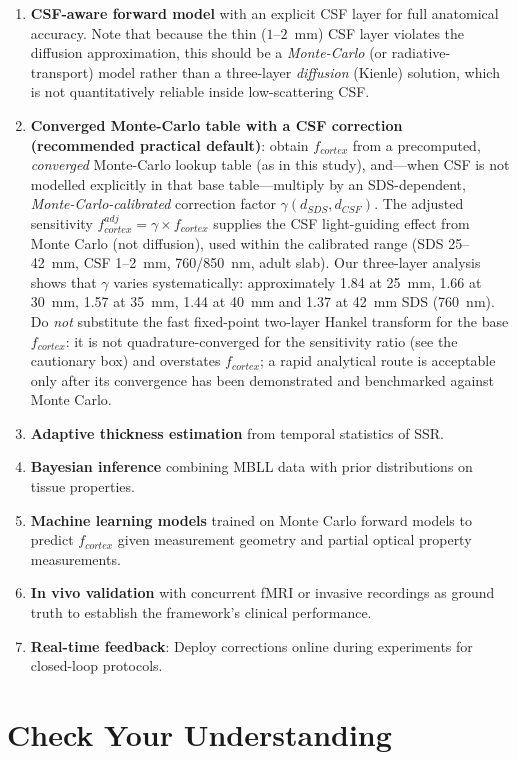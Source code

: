 \documentclass[12pt]{article}
\def\text#1{#1}%
\begin{document}
\begin{enumerate}
\item \textbf{CSF-aware forward model} with an explicit CSF layer for full anatomical accuracy. Note that because the thin ($1$--$2$~mm) CSF layer violates the diffusion approximation, this should be a \emph{Monte-Carlo} (or radiative-transport) model rather than a three-layer \emph{diffusion} (Kienle) solution, which is not quantitatively reliable inside low-scattering CSF.
\item \textbf{Converged Monte-Carlo table with a CSF correction (recommended practical default)}: obtain $f_{\text{cortex}}$ from a precomputed, \emph{converged} Monte-Carlo lookup table (as in this study), and---when CSF is not modelled explicitly in that base table---multiply by an SDS-dependent, \emph{Monte-Carlo-calibrated} correction factor $\gamma(d_{\text{SDS}}, d_{\text{CSF}})$. The adjusted sensitivity $f_{\text{cortex}}^{\text{adj}} = \gamma \times f_{\text{cortex}}$ supplies the CSF light-guiding effect from Monte Carlo (not diffusion), used within the calibrated range (SDS 25--42~mm, CSF 1--2~mm, 760/850~nm, adult slab). Our three-layer analysis shows that $\gamma$ varies systematically: approximately 1.84 at 25~mm, 1.66 at 30~mm, 1.57 at 35~mm, 1.44 at 40~mm and 1.37 at 42~mm SDS (760~nm). Do \emph{not} substitute the fast fixed-point two-layer Hankel transform for the base $f_{\text{cortex}}$: it is not quadrature-converged for the sensitivity ratio (see the cautionary box) and overstates $f_{\text{cortex}}$; a rapid analytical route is acceptable only after its convergence has been demonstrated and benchmarked against Monte Carlo.
\item \textbf{Adaptive thickness estimation} from temporal statistics of SSR.
\item \textbf{Bayesian inference} combining MBLL data with prior distributions on tissue properties.
\item \textbf{Machine learning models} trained on Monte Carlo forward models to predict $f_{\text{cortex}}$ given measurement geometry and partial optical property measurements.
\item \textbf{In vivo validation} with concurrent fMRI or invasive recordings as ground truth to establish the framework's clinical performance.
\item \textbf{Real-time feedback}: Deploy corrections online during experiments for closed-loop protocols.
\end{enumerate}

\newpage
\section{Check Your Understanding}
\end{document}
